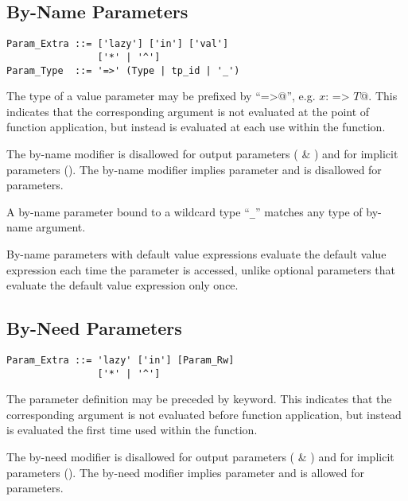 \subsection{By-Name Parameters}
\label{sec:by-name-parameters}

\syntax\begin{lstlisting}
Param_Extra ::= ['lazy'] ['in'] ['val']
                ['*' | '^']
Param_Type  ::= '=>' (Type | tp_id | '_')
\end{lstlisting}

The type of a value parameter may be prefixed by ``\lstinline@=>@'', e.g. \lstinline@$x$: => $T$@. This indicates that the corresponding argument is not evaluated at the point of function application, but instead is evaluated at each use within the function.

The by-name modifier is disallowed for output parameters ( \& ) and for implicit parameters (). The by-name modifier implies  parameter and is disallowed for  parameters. 

A by-name parameter bound to a wildcard type ``\lstinline!_!'' matches any type of by-name argument. 

By-name parameters with default value expressions evaluate the default value expression each time the parameter is accessed, unlike optional parameters that evaluate the default value expression only once. 






\subsection{By-Need Parameters}
\label{sec:by-need-parameters}

\syntax\begin{lstlisting}
Param_Extra ::= 'lazy' ['in'] [Param_Rw]
                ['*' | '^']
\end{lstlisting}

The parameter definition may be preceded by  keyword. This indicates that the corresponding argument is not evaluated before function application, but instead is evaluated the first time used within the function. 

The by-need modifier is disallowed for output parameters ( \& ) and for implicit parameters (). The by-need modifier implies  parameter and is allowed for  parameters. 

